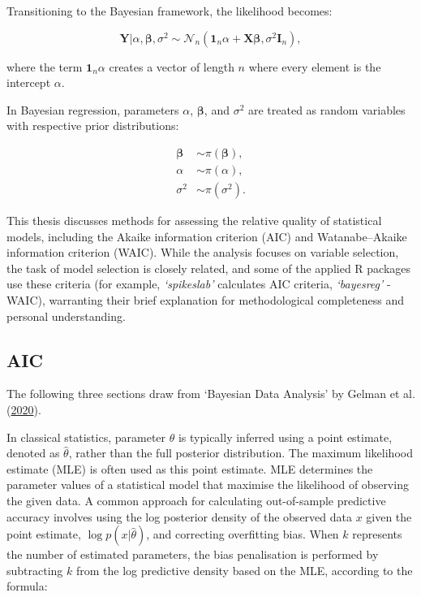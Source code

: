 \documentclass[
  11pt,
]{article}
\begin{document}
Transitioning to the Bayesian framework, the likelihood becomes:

\begin{equation}
\mathbf{Y} | \alpha, \boldsymbol{\beta}, \sigma^2 \sim \mathcal{N}_n(\mathbf{1}_n \alpha + \mathbf{X} \boldsymbol{\beta}, \sigma^2 \mathbf{I}_n),
\end{equation}

where the term \(\mathbf{1}_n \alpha\) creates a vector of length \(n\)
where every element is the intercept \(\alpha\).

In Bayesian regression, parameters \(\alpha\), \(\boldsymbol{\beta}\),
and \(\sigma^2\) are treated as random variables with respective prior
distributions:

\begin{equation}
\begin{aligned}
\boldsymbol{\beta} &\sim \pi(\boldsymbol{\beta}), \\
\alpha &\sim \pi(\alpha), \\
\sigma^2 &\sim \pi(\sigma^2).
\end{aligned}
\end{equation}

This thesis discusses methods for assessing the relative quality of
statistical models, including the Akaike information criterion (AIC) and
Watanabe--Akaike information criterion (WAIC). While the analysis
focuses on variable selection, the task of model selection is closely
related, and some of the applied R packages use these criteria (for
example, \emph{`spikeslab'} calculates AIC criteria, \emph{`bayesreg'} -
WAIC), warranting their brief explanation for methodological
completeness and personal understanding.

\subsection{AIC}

The following three sections draw from `Bayesian Data Analysis' by
Gelman et al. (\protect\hyperlink{ref-Gelman2020}{2020}).

In classical statistics, parameter \(\theta\) is typically inferred
using a point estimate, denoted as \(\hat{\theta}\), rather than the
full posterior distribution. The maximum likelihood estimate (MLE) is
often used as this point estimate. MLE determines the parameter values
of a statistical model that maximise the likelihood of observing the
given data. A common approach for calculating out-of-sample predictive
accuracy involves using the log posterior density of the observed data
\(x\) given the point estimate, \(\log p(x|\hat{\theta})\), and
correcting overfitting bias. When \(k\) represents the number of
estimated parameters, the bias penalisation is performed by subtracting
\(k\) from the log predictive density based on the MLE, according to the
formula:
\end{document}
